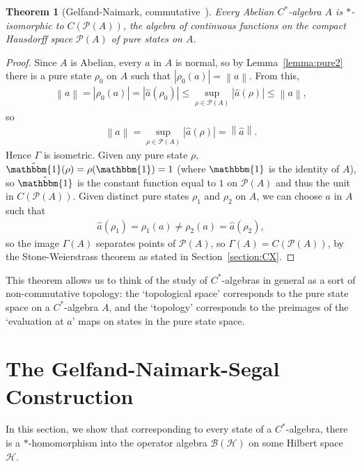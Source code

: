 \documentclass[11pt,a4paper]{report}
\theoremstyle{plain}
\newtheorem{thm}{Theorem}
\theoremstyle{definition}
\newcommand{\1}{\mathbbm{1}}
\renewcommand{\H}{\mathcal{H}}
\newcommand{\B}{\mathcal{B}}
\renewcommand{\P}[1]{\mathscr{P}(#1)}
\begin{document}
\begin{thm}[{Gelfand-Naimark, commutative~\cite[4.4.3]{kadison83}}] \label{thm:gnc}
	Every Abelian $C^\ast$-algebra $A$ is $\ast$-isomorphic to $C(\P A)$, the 
	algebra of continuous functions on the compact Hausdorff space $\P A$ of pure 
	states on $A$.

\end{thm}
\begin{proof}
	Since $A$ is Abelian, every $a$ in $A$ is normal, so by Lemma~\ref{lemma:pure2} 
	there is a pure state $\rho_0$ on $A$ such that $|\rho_0(a)|=\left\|a\right\|$. 
	From this, 
	\begin{align*}
			\left\|a\right\|	
		=|\rho_0(a)|
		=|\hat a(\rho_0)|
		\leq \sup_{\rho\in\P A}|\hat a(\rho)| 
		\leq \left\|a\right\|,
	\end{align*}
	so 
	\begin{align*}
		\left\|a\right\|=\sup_{\rho\in\P A} |\hat a (\rho)| = \left\|\hat a\right\|.
	\end{align*}
	Hence $\Gamma$ is isometric.
	Given any pure state $\rho$, $\hat \1(\rho) = \rho(\1) = 1$ (where $\1$ is the 
	identity of $A$), so $\hat\1$ is the constant function equal to $1$ on $\P A$ 
	and thus the unit in $C(\P A)$. Given distinct pure states $\rho_1$ and $\rho_2$ 
	on $A$, we can choose $a$ in $A$ such that 
	\begin{align*}
		\hat a(\rho_1) = \rho_1(a) \not= \rho_2(a) = \hat a(\rho_2),
	\end{align*}
	so the image $\Gamma(A)$ separates points of $\P A$, so $\Gamma(A)=C(\P A)$, 
	by the Stone-Weierstrass theorem as stated in Section~\ref{section:CX}.

\end{proof}

This theorem allows us to think of the study of $C^\ast$-algebras in general as 
a sort of non-commutative topology: the `topological space' corresponds to the 
pure state space on a $C^\ast$-algebra $A$, and the `topology' corresponds to 
the preimages of the `evaluation at $a$' maps on states in the pure state space.



	
\section{The Gelfand-Naimark-Segal Construction}
In this section, we show that corresponding to every state of a 
$C^\ast$-algebra, there is a $\ast$-homomorphism into the operator algebra 
$\B(\H)$ on some Hilbert space $\H$. 
\end{document}
